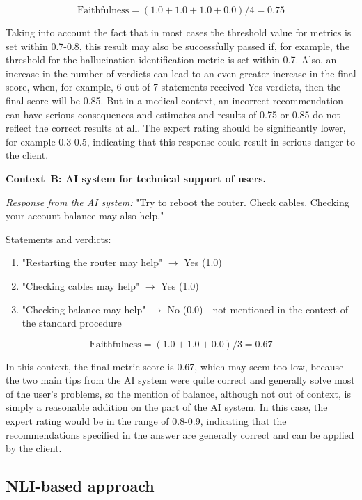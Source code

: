 \documentclass[sn-basic]{sn-jnl}
\theoremstyle{thmstyleone}%
\theoremstyle{thmstyletwo}%
\theoremstyle{thmstylethree}%
\begin{document}
\begin{equation} 
\text{Faithfulness} = (1.0 + 1.0 + 1.0 + 0.0) / 4 = 0.75
\end{equation} 

Taking into account the fact that in most cases the threshold value for metrics is set within 0.7-0.8, this result may also be successfully passed if, for example, the threshold for the hallucination identification metric is set within 0.7. Also, an increase in the number of verdicts can lead to an even greater increase in the final score, when, for example, 6 out of 7 statements received Yes verdicts, then the final score will be 0.85. But in a medical context, an incorrect recommendation can have serious consequences and estimates and results of 0.75 or 0.85 do not reflect the correct results at all. The expert rating should be significantly lower, for example 0.3-0.5, indicating that this response could result in serious danger to the client.

\textbf{Context~B: AI system for technical support of users.}

\textit{Response from the AI system:} "Try to reboot the router. Check cables. Checking your account balance may also help."

Statements and verdicts: 
\begin{enumerate} 
\item "Restarting the router may help" $\to$ Yes (1.0) 
\item "Checking cables may help" $\to$ Yes (1.0) 
\item "Checking balance may help" $\to$ No (0.0) - not mentioned in the context of the standard procedure 
\end{enumerate}

\begin{equation} 
\text{Faithfulness} = (1.0 + 1.0 + 0.0) / 3 = 0.67
\end{equation} 

In this context, the final metric score is 0.67, which may seem too low, because the two main tips from the AI system were quite correct and generally solve most of the user's problems, so the mention of balance, although not out of context, is simply a reasonable addition on the part of the AI system. In this case, the expert rating would be in the range of 0.8-0.9, indicating that the recommendations specified in the answer are generally correct and can be applied by the client.

\subsection{NLI-based approach}
\end{document}

